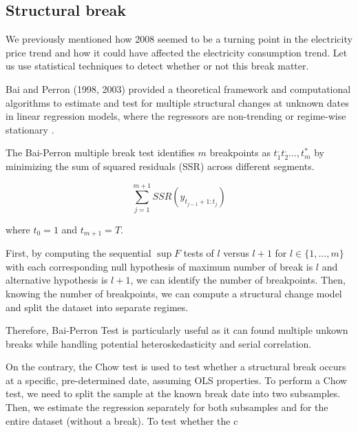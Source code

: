 \subsection{Structural break}
We previously mentioned how 2008 seemed to be a turning point in the electricity price trend and how it could have affected the electricity consumption trend. Let us use statistical techniques to detect whether or not this break matter. 

Bai and Perron (1998, 2003) provided a theoretical framework and computational algorithms to estimate and test for multiple structural changes at unknown dates in linear regression models, where the regressors are non-trending or regime-wise stationary \cite{bai1998estimating, bai2003computation}. 

The Bai-Perron multiple break test \cite{bai1998estimating} identifies $m$ breakpoints as $t_1^, t_2^, \dots, t_m^*$ by minimizing the sum of squared residuals (SSR) across different segments. 

$$\sum_{j=1}^{m+1} SSR(y_{t_{j-1}+1:t_j})$$

where $t_0 = 1$ and $t_{m+1} = T$. 

First, by computing the sequential $\sup F$ tests of $l$ versus $l+1$ for $l \in \{1, \dots, m\}$ with each corresponding null hypothesis of maximum number of break is $l$ and alternative hypothesis is $l+1$, we can identify the number of breakpoints. Then, knowing the number of breakpoints, we can compute a structural change model and split the dataset into separate regimes. 

Therefore, Bai-Perron Test is particularly useful as it can found multiple unkown breaks while handling potential heteroskedasticity and serial correlation.

On the contrary, the Chow test \cite{chow1960tests} is used to test whether a structural break occurs at a specific, pre-determined date, assuming OLS properties. To perform a Chow test, we need to split the sample at the known break date into two subsamples. Then, we estimate the regression separately for both subsamples and for the entire dataset (without a break). To test whether the c